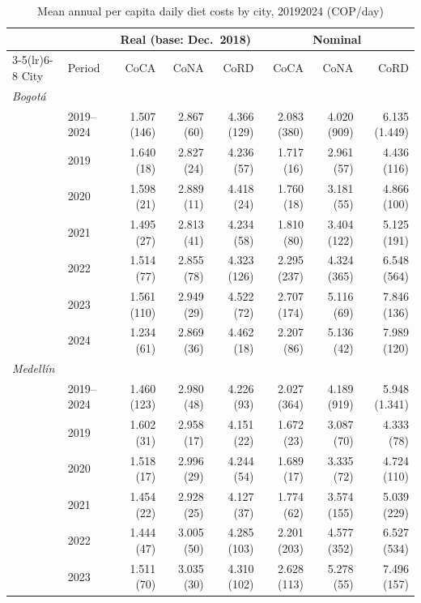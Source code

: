 \documentclass[Afour, sageh,times]{sagej}
\begin{document}
\begin{table}[htbp]
\centering
\begingroup
\fontsize{7}{8.5}\selectfont
\setlength{\tabcolsep}{3.5pt}
\renewcommand{\arraystretch}{0.95}

\caption{Mean annual per capita daily diet costs by city, 2019\textendash{}2024 (COP/day)}
\label{tab:cost_combined}

\begin{tabular}{llrrrrrr}
\toprule
 &  & \multicolumn{3}{c}{Real (base: Dec.\ 2018)} & \multicolumn{3}{c}{Nominal} \\
\cmidrule(lr){3-5}\cmidrule(lr){6-8}
City & Period & CoCA & CoNA & CoRD & CoCA & CoNA & CoRD \\
\midrule
\multicolumn{8}{l}{\textit{Bogotá}} \\
 & 2019–2024 & 1.507 (146) & 2.867 (60) & 4.366 (129) & 2.083 (380) & 4.020 (909) & 6.135 (1.449) \\
 & 2019      & 1.640 (18)  & 2.827 (24) & 4.236 (57)  & 1.717 (16)  & 2.961 (57)  & 4.436 (116)  \\
 & 2020      & 1.598 (21)  & 2.889 (11) & 4.418 (24)  & 1.760 (18)  & 3.181 (55)  & 4.866 (100)  \\
 & 2021      & 1.495 (27)  & 2.813 (41) & 4.234 (58)  & 1.810 (80)  & 3.404 (122) & 5.125 (191)  \\
 & 2022      & 1.514 (77)  & 2.855 (78) & 4.323 (126) & 2.295 (237) & 4.324 (365) & 6.548 (564)  \\
 & 2023      & 1.561 (110) & 2.949 (29) & 4.522 (72)  & 2.707 (174) & 5.116 (69)  & 7.846 (136)  \\
 & 2024      & 1.234 (61)  & 2.869 (36) & 4.462 (18)  & 2.207 (86)  & 5.136 (42)  & 7.989 (120)  \\
\midrule
\multicolumn{8}{l}{\textit{Medellín}} \\
 & 2019–2024 & 1.460 (123) & 2.980 (48) & 4.226 (93)  & 2.027 (364) & 4.189 (919) & 5.948 (1.341) \\
 & 2019      & 1.602 (31)  & 2.958 (17) & 4.151 (22)  & 1.672 (23)  & 3.087 (70)  & 4.333 (78)   \\
 & 2020      & 1.518 (17)  & 2.996 (29) & 4.244 (54)  & 1.689 (17)  & 3.335 (72)  & 4.724 (110)  \\
 & 2021      & 1.454 (22)  & 2.928 (25) & 4.127 (37)  & 1.774 (62)  & 3.574 (155) & 5.039 (229)  \\
 & 2022      & 1.444 (47)  & 3.005 (50) & 4.285 (103) & 2.201 (203) & 4.577 (352) & 6.527 (534)  \\
 & 2023      & 1.511 (70)  & 3.035 (30) & 4.310 (102) & 2.628 (113) & 5.278 (55)  & 7.496 (157)  \\

\end{tabular}
\end{table}
\end{document}
